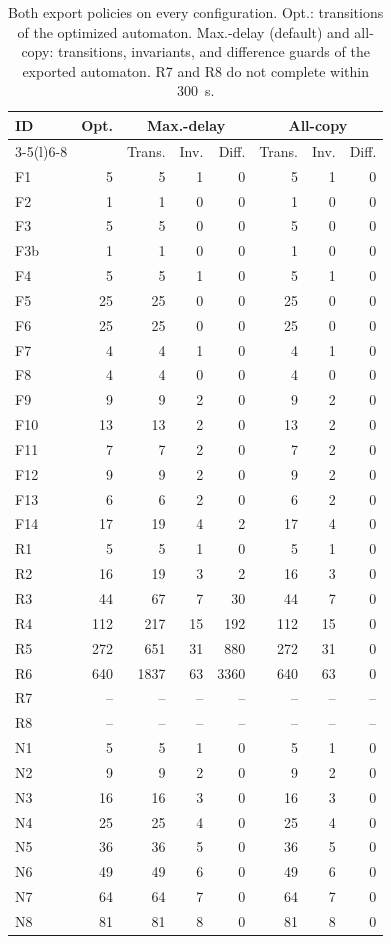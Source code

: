 \begin{table}[t]
\centering
\caption{Both export policies on every configuration. Opt.: transitions of the optimized automaton. Max.-delay (default) and all-copy: transitions, invariants, and difference guards of the exported automaton. R7 and R8 do not complete within 300~s.}
\label{tab:export-policies}
\scriptsize\setlength{\tabcolsep}{4pt}
\begin{tabular}{@{}lrrrrrrr@{}}
\toprule
ID & Opt. & \multicolumn{3}{c}{Max.-delay} & \multicolumn{3}{c}{All-copy}\\
\cmidrule(lr){3-5}\cmidrule(l){6-8}
& & Trans. & Inv. & Diff. & Trans. & Inv. & Diff.\\
\midrule
F1 & 5 & 5 & 1 & 0 & 5 & 1 & 0\\
F2 & 1 & 1 & 0 & 0 & 1 & 0 & 0\\
F3 & 5 & 5 & 0 & 0 & 5 & 0 & 0\\
F3b & 1 & 1 & 0 & 0 & 1 & 0 & 0\\
F4 & 5 & 5 & 1 & 0 & 5 & 1 & 0\\
F5 & 25 & 25 & 0 & 0 & 25 & 0 & 0\\
F6 & 25 & 25 & 0 & 0 & 25 & 0 & 0\\
F7 & 4 & 4 & 1 & 0 & 4 & 1 & 0\\
F8 & 4 & 4 & 0 & 0 & 4 & 0 & 0\\
F9 & 9 & 9 & 2 & 0 & 9 & 2 & 0\\
F10 & 13 & 13 & 2 & 0 & 13 & 2 & 0\\
F11 & 7 & 7 & 2 & 0 & 7 & 2 & 0\\
F12 & 9 & 9 & 2 & 0 & 9 & 2 & 0\\
F13 & 6 & 6 & 2 & 0 & 6 & 2 & 0\\
F14 & 17 & 19 & 4 & 2 & 17 & 4 & 0\\
R1 & 5 & 5 & 1 & 0 & 5 & 1 & 0\\
R2 & 16 & 19 & 3 & 2 & 16 & 3 & 0\\
R3 & 44 & 67 & 7 & 30 & 44 & 7 & 0\\
R4 & 112 & 217 & 15 & 192 & 112 & 15 & 0\\
R5 & 272 & 651 & 31 & 880 & 272 & 31 & 0\\
R6 & 640 & 1837 & 63 & 3360 & 640 & 63 & 0\\
R7 & -- & -- & -- & -- & -- & -- & --\\
R8 & -- & -- & -- & -- & -- & -- & --\\
N1 & 5 & 5 & 1 & 0 & 5 & 1 & 0\\
N2 & 9 & 9 & 2 & 0 & 9 & 2 & 0\\
N3 & 16 & 16 & 3 & 0 & 16 & 3 & 0\\
N4 & 25 & 25 & 4 & 0 & 25 & 4 & 0\\
N5 & 36 & 36 & 5 & 0 & 36 & 5 & 0\\
N6 & 49 & 49 & 6 & 0 & 49 & 6 & 0\\
N7 & 64 & 64 & 7 & 0 & 64 & 7 & 0\\
N8 & 81 & 81 & 8 & 0 & 81 & 8 & 0\\
\bottomrule
\end{tabular}
\end{table}

